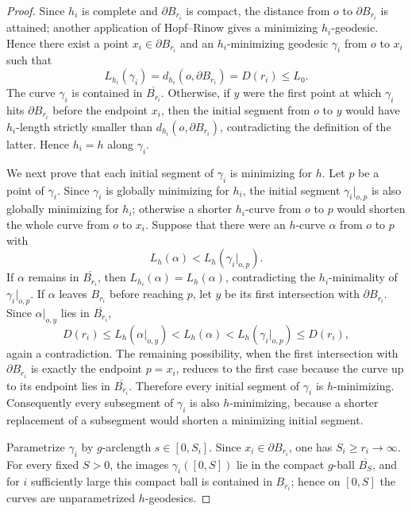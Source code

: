 \documentclass[11pt]{amsart}
\numberwithin{equation}{section}
\begin{document}
\begin{proof}
Since $h_i$ is complete and $\partial B_{r_i}$ is compact, the distance from $o$ to $\partial B_{r_i}$ is attained; another application of Hopf--Rinow gives a minimizing $h_i$-geodesic.  Hence there exist a point $x_i\in\partial B_{r_i}$ and an $h_i$-minimizing geodesic $\gamma_i$ from $o$ to $x_i$ such that
$$
        L_{h_i}(\gamma_i)=d_{h_i}(o,\partial B_{r_i})=D(r_i)\leq L_0.
$$
The curve $\gamma_i$ is contained in $\overline{B_{r_i}}$.  Otherwise, if $y$ were the first point at which $\gamma_i$ hits $\partial B_{r_i}$ before the endpoint $x_i$, then the initial segment from $o$ to $y$ would have $h_i$-length strictly smaller than $d_{h_i}(o,\partial B_{r_i})$, contradicting the definition of the latter.  Hence $h_i=h$ along $\gamma_i$.

We next prove that each initial segment of $\gamma_i$ is minimizing for $h$.  Let $p$ be a point of $\gamma_i$.  Since $\gamma_i$ is globally minimizing for $h_i$, the initial segment $\gamma_i|_{o,p}$ is also globally minimizing for $h_i$; otherwise a shorter $h_i$-curve from $o$ to $p$ would shorten the whole curve from $o$ to $x_i$.  Suppose that there were an $h$-curve $\alpha$ from $o$ to $p$ with
$$
        L_h(\alpha)<L_h(\gamma_i|_{o,p}).
$$
If $\alpha$ remains in $\overline{B_{r_i}}$, then $L_{h_i}(\alpha)=L_h(\alpha)$, contradicting the $h_i$-minimality of $\gamma_i|_{o,p}$.  If $\alpha$ leaves $B_{r_i}$ before reaching $p$, let $y$ be its first intersection with $\partial B_{r_i}$.  Since $\alpha|_{o,y}$ lies in $\overline{B_{r_i}}$,
$$
        D(r_i)\leq L_h(\alpha|_{o,y})<L_h(\alpha)<L_h(\gamma_i|_{o,p})\leq D(r_i),
$$
again a contradiction.  The remaining possibility, when the first intersection with $\partial B_{r_i}$ is exactly the endpoint $p=x_i$, reduces to the first case because the curve up to its endpoint lies in $\overline{B_{r_i}}$.  Therefore every initial segment of $\gamma_i$ is $h$-minimizing.  Consequently every subsegment of $\gamma_i$ is also $h$-minimizing, because a shorter replacement of a subsegment would shorten a minimizing initial segment.

Parametrize $\gamma_i$ by $g$-arclength $s\in[0,S_i]$.  Since $x_i\in\partial B_{r_i}$, one has $S_i\geq r_i\to\infty$.  For every fixed $S>0$, the images $\gamma_i([0,S])$ lie in the compact $g$-ball $\overline{B_S}$, and for $i$ sufficiently large this compact ball is contained in $B_{r_i}$; hence on $[0,S]$ the curves are unparametrized $h$-geodesics.


\end{proof}
\end{document}
